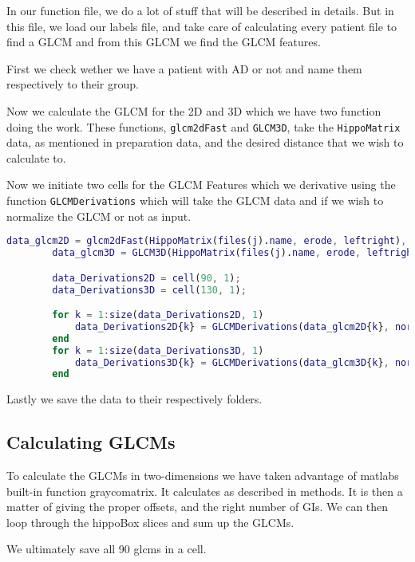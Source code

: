 In our function file, we do a lot of stuff that will be described in details. But in this file, we load our labels file, and take care of calculating every patient file to find a GLCM and from this GLCM we find the GLCM features.

First we check wether we have a patient with AD or not and name them respectively to their group.

Now we calculate the GLCM for the 2D and 3D which we have two function doing the work. These functions, \texttt{glcm2dFast} and \texttt{GLCM3D}, take the \texttt{HippoMatrix} data, as mentioned in preparation data, and the desired distance that we wish to calculate to.

Now we initiate two cells for the GLCM Features which we derivative using the function \texttt{GLCMDerivations} which will take the GLCM data and if we wish to normalize the GLCM or not as input.

\begin{lstlisting}[language=Matlab]
        data_glcm2D = glcm2dFast(HippoMatrix(files(j).name, erode, leftright), 10);
        data_glcm3D = GLCM3D(HippoMatrix(files(j).name, erode, leftright),10);

        data_Derivations2D = cell(90, 1);
        data_Derivations3D = cell(130, 1);

        for k = 1:size(data_Derivations2D, 1)
            data_Derivations2D{k} = GLCMDerivations(data_glcm2D{k}, norm);
        end
        for k = 1:size(data_Derivations3D, 1)
            data_Derivations3D{k} = GLCMDerivations(data_glcm3D{k}, norm);
        end
\end{lstlisting}

Lastly we save the data to their respectively folders.

\subsection{Calculating GLCMs}

To calculate the GLCMs in two-dimensions we have taken advantage of matlabs built-in function graycomatrix. It calculates as described in methods. It is then a matter of giving the proper offsets, and the right number of GIs. We can then loop through the hippoBox slices and sum up the GLCMs.

We ultimately save all 90 glcms in a cell.

